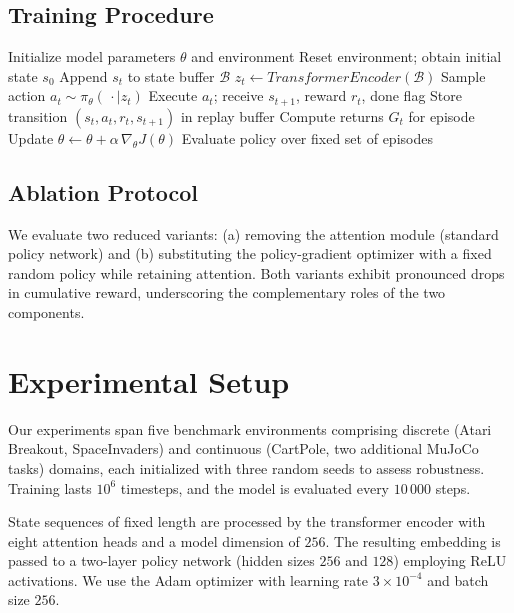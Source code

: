 \documentclass{article}
\begin{document}
\subsection{Training Procedure}
\begin{algorithm}[H]
  \caption{Attention-Driven Policy Gradient Training}
  \begin{algorithmic}[1]
    \State Initialize model parameters $\theta$ and environment
      \State Reset environment; obtain initial state $s_{0}$
        \State Append $s_{t}$ to state buffer $\mathcal{B}$
        \State $z_{t} \gets \textit{TransformerEncoder}(\mathcal{B})$
        \State Sample action $a_{t} \sim \pi_{\theta}(\,\cdot\mid z_{t})$
        \State Execute $a_{t}$; receive $s_{t+1}$, reward $r_{t}$, done flag
        \State Store transition $(s_{t}, a_{t}, r_{t}, s_{t+1})$ in replay buffer
      \EndWhile
      \State Compute returns $G_{t}$ for episode
      \State Update $\theta \leftarrow \theta + \alpha \, \nabla_{\theta} J(\theta)$
        \State Evaluate policy over fixed set of episodes
      \EndIf
    \EndFor
  \end{algorithmic}
\end{algorithm}

\subsection{Ablation Protocol}
We evaluate two reduced variants: (a) removing the attention module (standard policy network) and (b) substituting the policy-gradient optimizer with a fixed random policy while retaining attention. Both variants exhibit pronounced drops in cumulative reward, underscoring the complementary roles of the two components.

\section{Experimental Setup}
Our experiments span five benchmark environments comprising discrete (Atari Breakout, SpaceInvaders) and continuous (CartPole, two additional MuJoCo tasks) domains, each initialized with three random seeds to assess robustness. Training lasts $10^{6}$ timesteps, and the model is evaluated every $10\,000$ steps.

State sequences of fixed length are processed by the transformer encoder with eight attention heads and a model dimension of $256$. The resulting embedding is passed to a two-layer policy network (hidden sizes $256$ and $128$) employing ReLU activations. We use the Adam optimizer with learning rate $3\times10^{-4}$ and batch size $256$.
\end{document}
